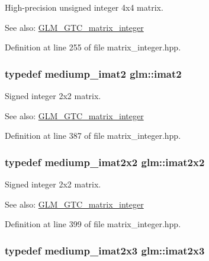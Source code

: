 High-precision unsigned integer 4x4 matrix. \begin{Desc}
\item[See also:]\hyperlink{group__gtc__matrix__integer}{GLM\_\-GTC\_\-matrix\_\-integer} \end{Desc}


Definition at line 255 of file matrix\_\-integer.hpp.\hypertarget{group__gtc__matrix__integer_g77a581b3366fb63fc72f8f20830003e0}{
\subsubsection[imat2]{\setlength{\rightskip}{0pt plus 5cm}typedef mediump\_\-imat2 {\bf glm::imat2}}}
\label{group__gtc__matrix__integer_g77a581b3366fb63fc72f8f20830003e0}


Signed integer 2x2 matrix. \begin{Desc}
\item[See also:]\hyperlink{group__gtc__matrix__integer}{GLM\_\-GTC\_\-matrix\_\-integer} \end{Desc}


Definition at line 387 of file matrix\_\-integer.hpp.\hypertarget{group__gtc__matrix__integer_gf7f44f44d966377666d41ed059524732}{
\subsubsection[imat2x2]{\setlength{\rightskip}{0pt plus 5cm}typedef mediump\_\-imat2x2 {\bf glm::imat2x2}}}
\label{group__gtc__matrix__integer_gf7f44f44d966377666d41ed059524732}


Signed integer 2x2 matrix. \begin{Desc}
\item[See also:]\hyperlink{group__gtc__matrix__integer}{GLM\_\-GTC\_\-matrix\_\-integer} \end{Desc}


Definition at line 399 of file matrix\_\-integer.hpp.\hypertarget{group__gtc__matrix__integer_g143bc5177bac9991d84b70da03952516}{
\subsubsection[imat2x3]{\setlength{\rightskip}{0pt plus 5cm}typedef mediump\_\-imat2x3 {\bf glm::imat2x3}}}
\label{group__gtc__matrix__integer_g143bc5177bac9991d84b70da03952516}


